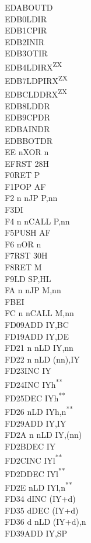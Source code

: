 \documentclass[12pt,twoside,openright,a4paper]{book}
\newcommand{\UNDOC}{\textnormal{\textsuperscript{**}}}
\newcommand{\ZXN}{\textnormal{\textsuperscript{ZX}}}
\begin{document}
\begin{multicols}{3}
{\begin{tabbing}
	EDAB\>OUTD\\
	EDB0\>LDIR\\
	EDB1\>CPIR\\
	EDB2\>INIR\\
	EDB3\>OTIR\\
	EDB4\>LDIRX\ZXN\\
	EDB7\>LDPIRX\ZXN\\
	EDBC\>LDDRX\ZXN\\
	EDB8\>LDDR\\
	EDB9\>CPDR\\
	EDBA\>INDR\\
	EDBB\>OTDR\\
	EE n\>XOR n\\
	EF\>RST 28H\\
	F0\>RET P\\
	F1\>POP AF\\
	F2 n n\>JP P,nn\\
	F3\>DI\\
	F4 n n\>CALL P,nn\\
	F5\>PUSH AF\\
	F6 n\>OR n\\
	F7\>RST 30H\\
	F8\>RET M\\
	F9\>LD SP,HL\\
	FA n n\>JP M,nn\\
	FB\>EI\\
	FC n n\>CALL M,nn\\
	FD09\>ADD IY,BC\\
	FD19\>ADD IY,DE\\
	FD21 n n\>LD IY,nn\\
	FD22 n n\>LD (nn),IY\\
	FD23\>INC IY\\
	FD24\>INC IYh\UNDOC\\
	FD25\>DEC IYh\UNDOC\\
	FD26 n\>LD IYh,n\UNDOC\\
	FD29\>ADD IY,IY\\
	FD2A n n\>LD IY,(nn)\\
	FD2B\>DEC IY\\
	FD2C\>INC IYl\UNDOC\\
	FD2D\>DEC IYl\UNDOC\\
	FD2E n\>LD IYl,n\UNDOC\\
	FD34 d\>INC (IY+d)\\
	FD35 d\>DEC (IY+d)\\
	FD36 d n\>LD (IY+d),n\\
	FD39\>ADD IY,SP\\

\end{tabbing}}
\end{multicols}
\end{document}
